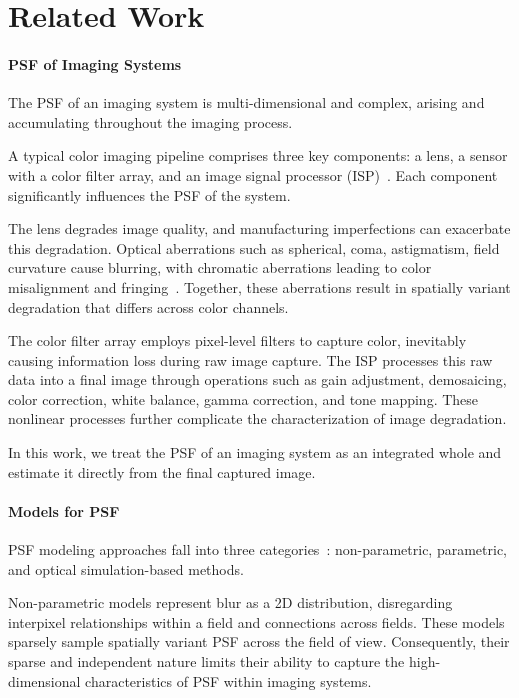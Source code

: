 \section{Related Work}
\label{sec:related}



\paragraph{PSF of Imaging Systems}

The PSF of an imaging system is multi-dimensional and complex, arising and accumulating throughout the imaging process.

A typical color imaging pipeline comprises three key components: a lens, a sensor with a color filter array, and an image signal processor (ISP)~\cite{ramanath2005color,brown2019color,delbracio2021mobile}. Each component significantly influences the PSF of the system.

The lens degrades image quality, and manufacturing imperfections can exacerbate this degradation. Optical aberrations such as spherical, coma, astigmatism, field curvature\cite{hopkins1985image,wyant1992basic} cause blurring, with chromatic aberrations leading to color misalignment and fringing~\cite{sasian2012introduction}. Together, these aberrations result in spatially variant degradation that differs across color channels. 

The color filter array employs pixel-level filters to capture color, inevitably causing information loss during raw image capture. The ISP processes this raw data into a final image through operations such as gain adjustment, demosaicing, color correction, white balance, gamma correction, and tone mapping. These nonlinear processes further complicate the characterization of image degradation.

In this work, we treat the PSF of an imaging system as an integrated whole and estimate it directly from the final captured image.


\paragraph{Models for PSF}

PSF modeling approaches fall into three categories~\cite{lin2023learning}: non-parametric, parametric, and optical simulation-based methods.

Non-parametric models represent blur as a 2D distribution, disregarding interpixel relationships within a field and connections across fields. These models sparsely sample spatially variant PSF across the field of view. Consequently, their sparse and independent nature limits their ability to capture the high-dimensional characteristics of PSF within imaging systems.

